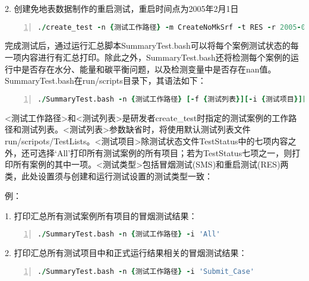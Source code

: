2. 创建免地表数据制作的重启测试，重启时间点为2005年2月1日
\begin{lstlisting}[language=fortran, basicstyle=\linespread{1.0}\footnotesize\ttfamily, commentstyle=\color{black}, numbers=left, numberstyle=\tiny, xleftmargin=1.5em,xrightmargin=0em, aboveskip=1em]
   ./create_test -n {测试工作路径} -m CreateNoMkSrf -t RES -r 2005-02-01
\end{lstlisting}


完成测试后，通过运行汇总脚本SummaryTest.bash可以将每个案例测试状态的每一项内容进行有汇总打印。除此之外，SummaryTest.bash还将检测每个案例的运行中是否存在水分、能量和碳平衡问题，以及检测变量中是否存在nan值。SummaryTest.bash在run/scripts目录下，其语法如下：

\begin{lstlisting}[language=fortran, basicstyle=\linespread{1.0}\footnotesize\ttfamily, commentstyle=\color{black}, numbers=left, numberstyle=\tiny, xleftmargin=1.5em,xrightmargin=0em, aboveskip=1em]
   ./SummaryTest.bash -n {测试工作路径} [-f {测试列表}][-i {测试项目}][-t {测试类型}]
\end{lstlisting}

<测试工作路径>和<测试列表>是研发者create\_test时指定的测试案例的工作路径和测试列表。<测试列表>参数缺省时，将使用默认测试列表文件run/scripots/TestLists。<测试项目>除测试状态文件TestStatus中的七项内容之外，还可选择‘All’打印所有测试案例的所有项目；若为TestStatus七项之一，则打印所有案例的其中一项。<测试类型>包括冒烟测试(SMS)和重启测试(RES)两类，此处设置须与创建和运行测试设置的测试类型一致：

例：

1. 打印汇总所有测试案例所有项目的冒烟测试结果：

\begin{lstlisting}[language=fortran, basicstyle=\linespread{1.0}\footnotesize\ttfamily, commentstyle=\color{black}, numbers=left, numberstyle=\tiny, xleftmargin=1.5em,xrightmargin=0em, aboveskip=1em]
   ./SummaryTest.bash -n {测试工作路径} -i 'All'
\end{lstlisting}

2. 打印汇总所有测试项目中和正式运行结果相关的冒烟测试结果：

\begin{lstlisting}[language=fortran, basicstyle=\linespread{1.0}\footnotesize\ttfamily, commentstyle=\color{black}, numbers=left, numberstyle=\tiny, xleftmargin=1.5em,xrightmargin=0em, aboveskip=1em]
   ./SummaryTest.bash -n {测试工作路径} -i 'Submit_Case'
\end{lstlisting}

